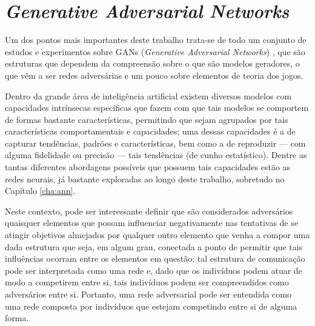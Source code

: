 \chapter{\textit{Generative Adversarial Networks}}
\label{cha:gan}

Um dos pontos mais importantes deste trabalho trata-se de todo um conjunto de estudos e experimentos sobre GANs (\textit{Generative Adversarial Networks}) \citep{NIPS2014_5423}, que são estruturas que dependem da compreensão sobre o que são modelos geradores, o que vêm a ser redes adversárias e um pouco sobre elementos de teoria dos jogos.


Dentro da grande área de inteligência artificial existem diversos modelos com capacidades intrínsecas específicas que fazem com que tais modelos se comportem de formas bastante características, permitindo que sejam agrupados por tais características comportamentais e capacidades; uma dessas capacidades é a de capturar tendências, padrões e características, bem como a de reproduzir --- com alguma fidelidade ou precisão --- tais tendências (de cunho estatístico). Dentre as tantas diferentes abordagens possíveis que possuem tais capacidades estão as redes neurais, já bastante exploradas ao longo deste trabalho, sobretudo no Capítulo \ref{cha:ann}.




Neste contexto, pode ser interessante definir que são considerados adversários quaisquer elementos que possam influenciar negativamente nas tentativas de se atingir objetivos almejados por qualquer outro elemento que venha a compor uma dada estrutura que seja, em algum grau, conectada a ponto de permitir que tais influências ocorram entre os elementos em questão; tal estrutura de comunicação pode ser interpretada como uma rede e, dado que os indivíduos podem atuar de modo a competirem entre si, tais indivíduos podem ser compreendidos como adversários entre si. Portanto, uma rede adversarial pode ser entendida como uma rede composta por indivíduos que estejam competindo entre si de alguma forma.



